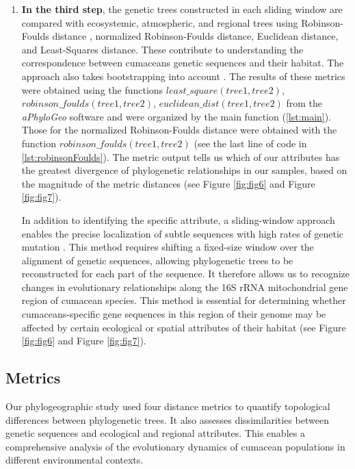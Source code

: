 \begin{enumerate}
\item \textbf{In the third step}, the genetic trees constructed in each sliding window are compared with ecosystemic, atmospheric, and regional trees using Robinson-Foulds distance \citep{robinson_comparison_1981}, normalized Robinson-Foulds distance, Euclidean distance, and Least-Squares distance. These contribute to understanding the correspondence between cumaceans genetic sequences and their habitat. The approach also takes bootstrapping into account \citep{koshkarov_phylogeography_2022}. The results of these metrics were obtained using the functions $least\_square(tree1, tree2)$, $robinson\_foulds(tree1, tree2)$, $euclidean\_dist(tree1, tree2)$ from the \textit{aPhyloGeo} software and were organized by the main function (\autoref{lst:main}). Those for the normalized Robinson-Foulds distance were obtained with the function $robinson\_foulds(tree1, tree2)$ (see the last line of code in \autoref{lst:robinsonFoulds}). The metric output tells us which of our attributes has the greatest divergence of phylogenetic relationships in our samples, based on the magnitude of the metric distances (see Figure \ref{fig:fig6} and Figure \ref{fig:fig7}). 

In addition to identifying the specific attribute, a sliding-window approach enables the precise localization of subtle sequences with high rates of genetic mutation \citep{koshkarov_phylogeography_2022}. This method requires shifting a fixed-size window over the alignment of genetic sequences, allowing phylogenetic trees to be reconstructed for each part of the sequence. It therefore allows us to recognize changes in evolutionary relationships along the 16S rRNA mitochondrial gene region of cumacean species. This method is essential for determining whether cumaceans-specific gene sequences in this region of their genome may be affected by certain ecological or spatial attributes of their habitat (see Figure \ref{fig:fig6} and Figure \ref{fig:fig7}).
\end{enumerate}

\subsection{Metrics}\label{metrics}
Our phylogeographic study used four distance metrics to quantify topological differences between phylogenetic trees. It also assesses dissimilarities between genetic sequences and ecological and regional attributes. This enables a comprehensive analysis of the evolutionary dynamics of cumacean populations in different environmental contexts. 

